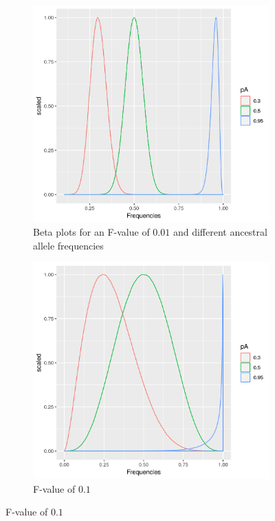 \documentclass[a4paper, 11pt]{article}
\begin{document}
\begin{figure}
\centering
\begin{subfigure}
\centering
\caption{Beta plots for an F-value of $0.01$ and different ancestral allele frequencies}
\includegraphics[scale=0.5]{rbeta_plot_001}
\end{subfigure}
\begin{subfigure}
\centering
\caption{F-value of $0.1$}
\includegraphics[scale=0.5]{rbeta_plot_01}

\end{subfigure}
\end{figure}
\end{document}
